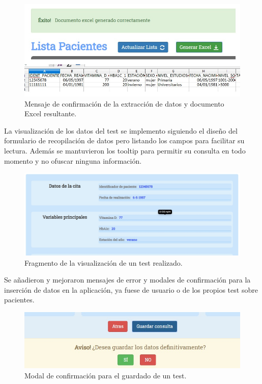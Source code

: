 \begin{figure}[h]
    \centering
     \includegraphics[width=1\textwidth]{images/extraerDatos.jpg}
    \caption{Mensaje de confirmación de la extracción de datos y documento Excel resultante.}
\end{figure}
\newpage

La visualización de los datos del test se implemento siguiendo el diseño del formulario de recopilación de datos pero listando los campos para facilitar su lectura. Además se mantuvieron los tooltip para permitir su consulta en todo momento y no ofuscar ninguna información.

\begin{figure}[h]
    \centering
     \includegraphics[width=1\textwidth]{images/visualizarTest.jpg}
    \caption{Fragmento de la visualización de un test realizado.}
\end{figure}

Se añadieron y mejoraron mensajes de error y modales de confirmación para la inserción de datos en la aplicación, ya fuese de usuario o de los propios test sobre pacientes.

\begin{figure}[h]
    \centering
     \includegraphics[width=1\textwidth]{images/modales.jpg}
    \caption{Modal de confirmación para el guardado de un test.}
\end{figure}

